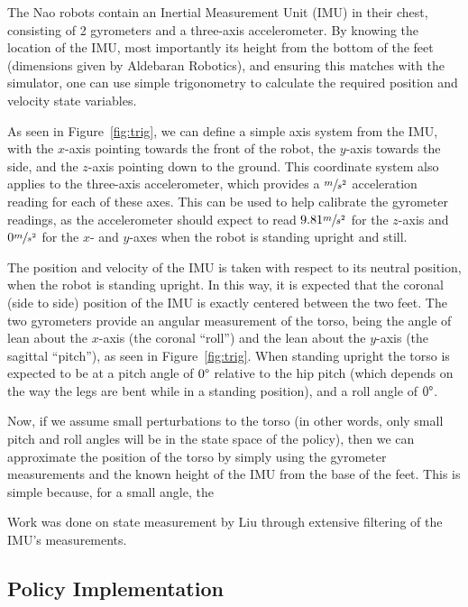 The Nao robots contain an Inertial Measurement Unit (IMU) in their chest, consisting of 2 gyrometers and a three-axis accelerometer.\cite{nao_imu} By knowing the location of the IMU, most importantly its height from the bottom of the feet (dimensions given by Aldebaran Robotics), and ensuring this matches with the simulator, one can use simple trigonometry to calculate the required position and velocity state variables. 

As seen in Figure~\ref{fig:trig}, we can define a simple axis system from the IMU, with the $x$-axis pointing towards the front of the robot, the $y$-axis towards the side, and the $z$-axis pointing down to the ground. This coordinate system also applies to the three-axis accelerometer, which provides a $\sfrac{m}{s^2}$ acceleration reading for each of these axes. This can be used to help calibrate the gyrometer readings, as the accelerometer should expect to read $9.81\sfrac{m}{s^2}$ for the $z$-axis and $0\sfrac{m}{s^2}$ for the $x$- and $y$-axes when the robot is standing upright and still.


The position and velocity of the IMU is taken with respect to its neutral position, when the robot is standing upright. In this way, it is expected that the coronal (side to side) position of the IMU is exactly centered between the two feet. The two gyrometers provide an angular measurement of the torso, being the angle of lean about the $x$-axis (the coronal ``roll'') and the lean about the $y$-axis (the sagittal ``pitch''), as seen in Figure~\ref{fig:trig}. When standing upright the torso is expected to be at a pitch angle of $0\degree$ relative to the hip pitch (which depends on the way the legs are bent while in a standing position), and a roll angle of $0\degree$.

Now, if we assume small perturbations to the torso (in other words, only small pitch and roll angles will be in the state space of the policy), then we can approximate the position of the torso by simply using the gyrometer measurements and the known height of the IMU from the base of the feet. This is simple because, for a small angle, the %

Work was done on state measurement by Liu\cite{liu} through extensive filtering of the IMU's measurements.

\subsection{Policy Implementation}

